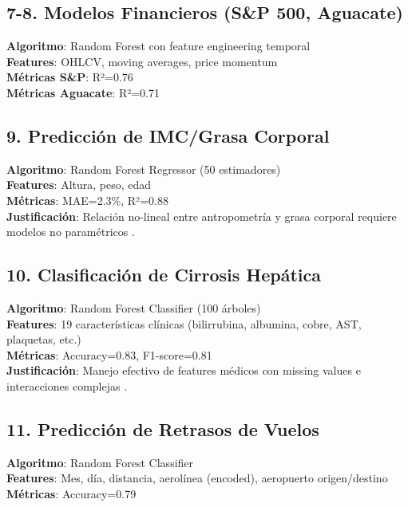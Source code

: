 \subsection{7-8. Modelos Financieros (S\&P 500, Aguacate)}

\textbf{Algoritmo}: Random Forest con feature engineering temporal \\
\textbf{Features}: OHLCV, moving averages, price momentum \\
\textbf{Métricas S\&P}: R²=0.76 \\
\textbf{Métricas Aguacate}: R²=0.71 \\

\subsection{9. Predicción de IMC/Grasa Corporal}

\textbf{Algoritmo}: Random Forest Regressor (50 estimadores) \\
\textbf{Features}: Altura, peso, edad \\
\textbf{Métricas}: MAE=2.3\%, R²=0.88 \\
\textbf{Justificación}: Relación no-lineal entre antropometría y grasa corporal requiere modelos no paramétricos \cite{deurenberg1991body}.

\subsection{10. Clasificación de Cirrosis Hepática}

\textbf{Algoritmo}: Random Forest Classifier (100 árboles) \\
\textbf{Features}: 19 características clínicas (bilirrubina, albumina, cobre, AST, plaquetas, etc.) \\
\textbf{Métricas}: Accuracy=0.83, F1-score=0.81 \\
\textbf{Justificación}: Manejo efectivo de features médicos con missing values e interacciones complejas \cite{caruana2006empirical}.

\subsection{11. Predicción de Retrasos de Vuelos}

\textbf{Algoritmo}: Random Forest Classifier \\
\textbf{Features}: Mes, día, distancia, aerolínea (encoded), aeropuerto origen/destino \\
\textbf{Métricas}: Accuracy=0.79 \\

